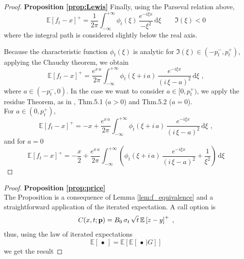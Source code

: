 \documentclass[12pt]{article}
\theoremstyle{definition}
\theoremstyle{remark}
\numberwithin{theorem}{section}
\numberwithin{proposition}{section}
\numberwithin{lemma}{section}
\numberwithin{corollary}{section}
\numberwithin{definition}{section}
\numberwithin{remark}{section}
\numberwithin{example}{section}
\newcommand{\E}{\mathbb{E}}
\begin{document}
\begin{proof}  {\bf  Proposition \ref{prop:Lewis} }
Finally, using the Parseval relation above,
\[
\E[f_t  -  x]^+ = \frac{1}{2 \pi} \int^{+\infty}_{- \infty} \phi_t(\xi) \,  \frac{e^{-i \xi x}}{ - \xi^2} \,\mathrm{d} \xi \qquad \Im(\xi) < 0
\]
where the integral path is considered slightly below the real axis.

Because the characteristic function $\phi_t(\xi) $  is  analytic for $\Im(\xi) \in (-p_t^-, p_t^+) $, applying the Chauchy theorem, we obtain 
\[
\E[f_t  -  x]^+ = \frac{\displaystyle e^{x \, a}}{2 \pi} \int^{+\infty}_{- \infty} \phi_t \left(\xi + {i} \,a  \right) \,  \frac{e^{-i \xi x}}{ \left(i \, \xi -  a \right)^2}\,\mathrm{d} \xi \,\,,
\]
where $a \in(-p_t^-, 0)$.
In the case we want to consider $a\in[0,p_t^+)$, we apply the residue Theorem, as in \cite{lee2004option}, Thm.5.1 ($a>0$) and Thm.5.2 ($a=0$).\\
For $a\in(0,p_t^+)$, 
\[
\E[f_t  -  x]^+ = -x+\frac{\displaystyle e^{x \, a}}{2 \pi} \int^{+\infty}_{- \infty} \phi_t \left(\xi + {i} \,a  \right) \,  \frac{e^{-i \xi x}}{ \left(i \, \xi -  a \right)^2}\, \mathrm{d} \xi \,\,,
\]
and for $a = 0$
\[
\E[f_t  -  x]^+ = -\frac{x}{2}+\frac{\displaystyle e^{x \, a}}{2 \pi} \int^{+\infty}_{- \infty}\left( \phi_t \left(\xi + {i} \,a  \right) \,  \frac{e^{-i \xi x}}{ \left(i \, \xi - a \right)^2}+\frac{1}{\xi^2}\right)\, \mathrm{d} \xi
\]
\end{proof}

\smallskip

\begin{proof} {\bf Proposition \ref{prop:price}} \\
The Proposition is a consequence of Lemma \ref{lem:f_equivalence} and a straightforward application of the iterated expectation.
A call option is
\[
C(x,t; {\bf p}) = B_0 \, \sigma_t \, \sqrt{ t}  \, \E  \left[  z -  y \right]^+ \;,
\]
thus, using the law of iterated expectations
\[
\E \left[ \, \bullet \, \right] =  \E [  \E [  \, \bullet \, | G ] ]
\]
we get the result

\end{proof}

\smallskip
\end{document}
